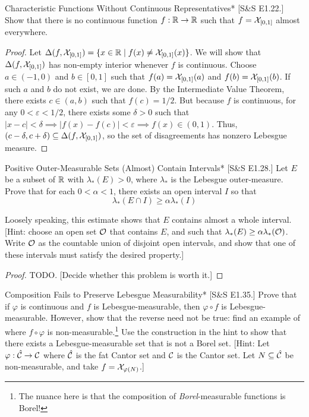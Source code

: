 \begin{problem}{Characteristic Functions Without Continuous Representatives}*
    [S\&S E1.22.] Show that there is no continuous function $f : \mathbb{R} \to \mathbb{R}$ such that $f = \mathcal{X}_{[0,1]}$ almost everywhere.
\end{problem}

\begin{proof}
    Let $\Delta(f, \mathcal{X}_{[0,1]}) = \{x \in \mathbb{R} \mid f(x) \neq \mathcal{X}_{[0,1]}(x)\}$. We will show that $\Delta(f, \mathcal{X}_{[0,1]})$ has non-empty interior whenever $f$ is continuous. Choose $a \in (-1,0)$ and $b \in [0,1]$ such that $f(a) = \mathcal{X}_{[0,1]}(a)$ and $f(b) = \mathcal{X}_{[0,1]}(b)$. If such $a$ and $b$ do not exist, we are done. By the Intermediate Value Theorem, there exists $c \in (a, b)$ such that $f(c) = 1/2$. But because $f$ is continuous, for any $0 < \varepsilon < 1/2$, there exists some $\delta > 0$ such that $|x - c| < \delta \implies |f(x) - f(c)| < \varepsilon \implies f(x) \in (0, 1)$. Thus, $(c - \delta, c + \delta) \subseteq \Delta(f, \mathcal{X}_{[0,1]})$, so the set of disagreements has nonzero Lebesgue measure. 
\end{proof}

\begin{problem}{Positive Outer-Measurable Sets (Almost) Contain Intervals}*
    [S\&S E1.28.] Let $E$ be a subset of $\mathbb{R}$ with $\lambda_*(E) > 0$, where $\lambda_*$ is the Lebesgue outer-measure. Prove that for each $0 < \alpha < 1$, there exists an open interval $I$ so that 
    $$
        \lambda_*(E \cap I) \geq \alpha \lambda_*(I)
    $$

    Loosely speaking, this estimate shows that $E$ contains almost a whole interval. [Hint: choose an open set $\mathcal{O}$ that contains $E$, and such that $\lambda_*(E) \geq \alpha \lambda_*(\mathcal{O})$. Write $\mathcal{O}$ as the countable union of disjoint open intervals, and show that one of these intervals must satisfy the desired property.]
\end{problem}

\begin{proof}
    TODO. [Decide whether this problem is worth it.]
\end{proof}

\begin{problem}{Composition Fails to Preserve Lebesgue Measurability}*
    [S\&S E1.35.] Prove that if $\varphi$ is continuous and $f$ is Lebesgue-measurable, then $\varphi \circ f$ is Lebesgue-measurable. However, show that the reverse need not be true: find an example of where $f \circ \varphi$ is non-measurable.\footnote{The nuance here is that the composition of \textit{Borel}-measurable functions is Borel!} Use the construction in the hint to show that there exists a Lebesgue-measurable set that is not a Borel set. 
    [Hint: Let $\varphi : \hat{\mathcal{C}} \to \mathcal{C}$ where $\hat{\mathcal{C}}$ is the fat Cantor set and $\mathcal{C}$ is the Cantor set. Let $N \subseteq \hat{\mathcal{C}}$ be non-measurable, and take $f = \mathcal{X}_{\varphi(N)}$.]
\end{problem}

